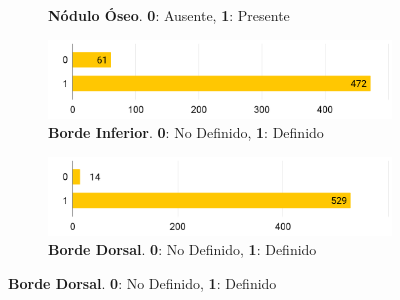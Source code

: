 \begin{figure}[H]
\begin{subfigure}{\textwidth}
    \caption[Distribución de Nódulo Óseo en datos]{\textbf{Nódulo Óseo}. \textbf{0}: Ausente, \textbf{1}: Presente}
    \label{fig:todd4}
\end{subfigure}
\begin{subfigure}{\textwidth}
    \centering
    \includegraphics[width=\linewidth]{imagenes/methods/5_bordeInferior.png}
    \caption[Distribución de Borde Inferior en datos]{\textbf{Borde Inferior}. \textbf{0}: No Definido, \textbf{1}: Definido}
    \label{fig:todd5}
\end{subfigure}
\begin{subfigure}{\textwidth}
    \centering
    \includegraphics[width=\linewidth]{imagenes/methods/6_bordeDorsal.png}
    \caption[Distribución de Borde Dorsal en datos]{\textbf{Borde Dorsal}. \textbf{0}: No Definido, \textbf{1}: Definido}
    \label{fig:todd6}
\end{subfigure}
\label{fig:toddDistr2}
\end{figure}

